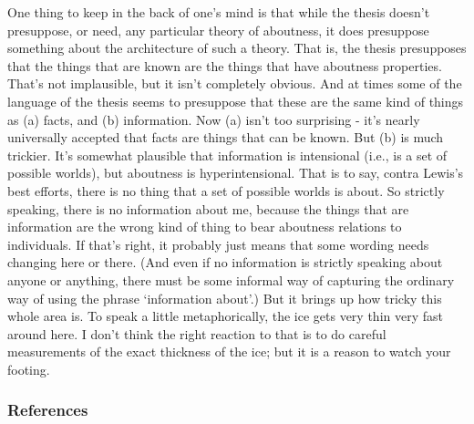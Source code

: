 \documentclass[
  letterpaper,
  DIV=11,
  numbers=noendperiod]{scrartcl}
\begin{document}
One thing to keep in the back of one's mind is that while the thesis
doesn't presuppose, or need, any particular theory of aboutness, it does
presuppose something about the architecture of such a theory. That is,
the thesis presupposes that the things that are known are the things
that have aboutness properties. That's not implausible, but it isn't
completely obvious. And at times some of the language of the thesis
seems to presuppose that these are the same kind of things as (a) facts,
and (b) information. Now (a) isn't too surprising - it's nearly
universally accepted that facts are things that can be known. But (b) is
much trickier. It's somewhat plausible that information is intensional
(i.e., is a set of possible worlds), but aboutness is hyperintensional.
That is to say, contra Lewis's best efforts, there is no thing that a
set of possible worlds is about. So strictly speaking, there is no
information about me, because the things that are information are the
wrong kind of thing to bear aboutness relations to individuals. If
that's right, it probably just means that some wording needs changing
here or there. (And even if no information is strictly speaking about
anyone or anything, there must be some informal way of capturing the
ordinary way of using the phrase `information about'.) But it brings up
how tricky this whole area is. To speak a little metaphorically, the ice
gets very thin very fast around here. I don't think the right reaction
to that is to do careful measurements of the exact thickness of the ice;
but it is a reason to watch your footing.

\hypertarget{references}{%
\subsubsection*{References}\label{references}}
\end{document}
